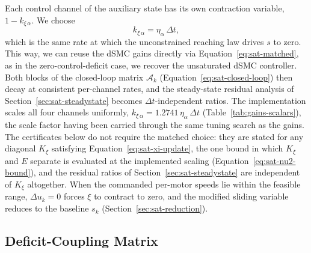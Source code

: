 \documentclass[conf]{new-aiaa}
\begin{document}
Each control channel of the auxiliary state has its own contraction variable, $1 - k_{\xi\,\alpha}$. We choose
\begin{equation}
\label{eq:sat-matched}
k_{\xi\, \alpha} = \eta_\alpha\, \Delta t,
\end{equation}
which is the same rate at which the unconstrained reaching law drives $s$ to zero. This way, we can reuse the dSMC gains directly via Equation~\ref{eq:sat-matched}, as in the zero-control-deficit case, we recover the unsaturated dSMC controller. Both blocks of the closed-loop matrix $\mathcal{A}_k$ (Equation~\ref{eq:sat-closed-loop}) then decay at consistent per-channel rates, and the steady-state residual analysis of Section~\ref{sec:sat-steadystate} becomes $\Delta t$-independent ratios. The implementation scales all four channels uniformly, $k_{\xi\,\alpha} = 1.2741\,\eta_\alpha\,\Delta t$ (Table~\ref{tab:gains-scalars}), the scale factor having been carried through the same tuning search as the gains. The certificates below do not require the matched choice: they are stated for any diagonal $K_\xi$ satisfying Equation~\ref{eq:sat-xi-update}, the one bound in which $K_\xi$ and $E$ separate is evaluated at the implemented scaling (Equation~\ref{eq:sat-nu2-bound}), and the residual ratios of Section~\ref{sec:sat-steadystate} are independent of $K_\xi$ altogether. When the commanded per-motor speeds lie within the feasible range, $\Delta u_k = 0$ forces $\xi$ to contract to zero, and the modified sliding variable reduces to the baseline $s_k$ (Section~\ref{sec:sat-reduction}).

\subsection{Deficit-Coupling Matrix}
\label{sec:sat-deficit}
\end{document}

